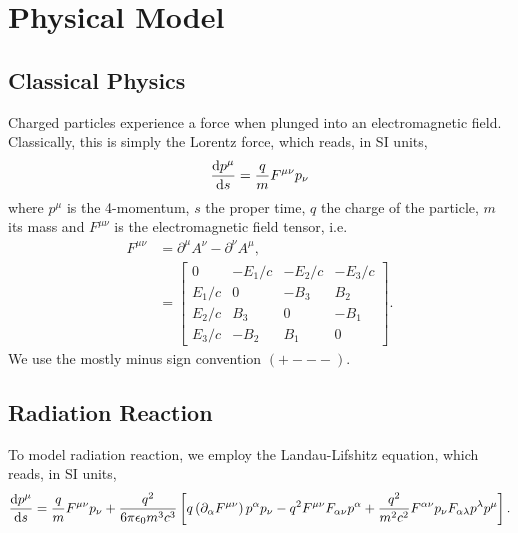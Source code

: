 
\chapter{Physical Model}

\section{Classical Physics}

Charged particles experience a force when plunged into an electromagnetic field.
Classically, this is simply the Lorentz force, which reads, in SI units,
  \begin{equation}
    \dv{p^\mu}{s} = \frac{q}{m}F^{\mu\nu}p_\nu
  \end{equation}
where $p^\mu$ is the 4-momentum, $s$ the proper time, $q$ the charge of the
particle, $m$ its mass and $F^{\mu\nu}$ is the electromagnetic field tensor, i.e.
  \begin{align}
    F^{\mu\nu} &= \partial^\mu A^\nu - \partial^\nu A^\mu, \\
               &= \begin{bmatrix}
                    0      & -E_1/c     & -E_2/c     & -E_3/c \\
                    E_1/c  & 0          & -B_3       & B_2     \\
                    E_2/c  & B_3        & 0          & -B_1    \\
                    E_3/c  & -B_2       & B_1        & 0
                  \end{bmatrix}.
  \end{align}
We use the mostly minus sign convention $(+---)$.

\section{Radiation Reaction}

To model radiation reaction, we employ the Landau-Lifshitz equation, which
reads, in SI units,
  \begin{equation}
    \dv{p^\mu}{s} = \frac{q}{m}F^{\mu\nu}p_\nu
                   +\frac{q^2}{6\pi\epsilon_0m^3c^3}
                      \left[
                        q\left(\partial_\alpha F^{\mu\nu}\right)p^\alpha p_\nu
                      - q^2 F^{\mu\nu}F_{\alpha\nu}p^\alpha
                      + \frac{q^2}{m^2c^2} F^{\alpha\nu}p_\nu F_{\alpha\lambda}p^\lambda p^\mu
                      \right].
  \end{equation}

